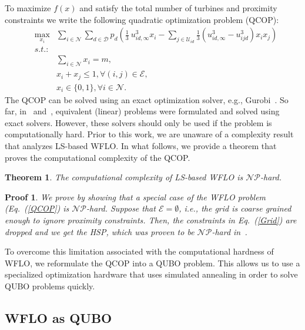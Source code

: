 \documentclass[preprint,12pt]{elsarticle}
\newtheorem{mythm}{Theorem}
\newtheorem{myproof}{Proof}
\begin{document}
To 
maximize $f(x)$ and satisfy the total number of turbines and proximity 
constraints we write
the following quadratic optimization problem (QCOP):
\begin{eqnarray} \label{QCOP}
&\max_{x_i}^{}& \sum_{i \in \mathcal{N}}^{} \sum_{d \in \mathcal{D}}^{} p_d ( \frac{1}{3} \ u_{id, \infty}^3 x_i  - \sum_{j \in \mathcal{U}_{id}}^{} \frac{1}{3}(u_{id, \infty} ^3 - u_{ijd}^3)x_i x_j)   \\
&s.t.:& \nonumber\\
&\mbox{       }& \sum_{i \in \mathcal{N}}^{} x_i = m,\label{Cardinality}\\
&\mbox{       }& x_i + x_j \leq 1,   \forall (i,j) \in \mathcal{E}, \label{Grid}\\
&\mbox{       }& x_i \in \{0,1\},     \forall i \in \mathcal{N}.
\end{eqnarray} The QCOP can be solved using an exact optimization solver, e.g., Gurobi~\cite{}. 
So far, in~\cite{Zhang2014} and~\cite{donovan2005wind}, equivalent (linear) problems were formulated and solved using 
exact solvers. However, these solvers should only be used if the problem is computationally hard.
Prior to this work, we are unaware of a complexity result that analyzes LS-based WFLO. In what follows, we provide
a theorem that proves the computational complexity of the QCOP. 
\begin{mythm}
	The computational complexity of LS-based WFLO is $\mathcal{NP}$-hard. 
\end{mythm}
\begin{myproof}
We prove by showing that a special case of the WFLO problem (Eq.~(\ref{QCOP}) is
$\mathcal{NP}$-hard. Suppose that $\mathcal{E} = \emptyset$, i.e., the grid is coarse grained enough to ignore proximity constraints. Then, the constraints in Eq.~(\ref{Grid})
are dropped and we get the HSP, which was proven to be $\mathcal{NP}$-hard in~\cite{billionnet2005different}.
	\end{myproof} To overcome this limitation associated with the computational hardness of WFLO,
we reformulate the QCOP into a QUBO problem. This allows us to use a specialized optimization hardware that uses
simulated annealing in order to solve QUBO problems quickly. 


\subsection{WFLO as QUBO}
\end{document}
